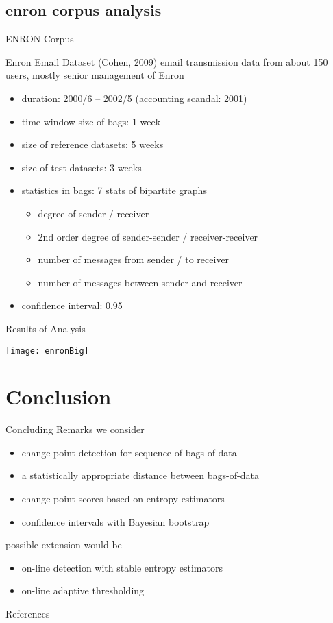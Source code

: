 \documentclass[fleqn,aspectratio=1610]{beamer}
\begin{document}
\subsection{enron corpus analysis}
\label{sec:orgead1550}
\begin{frame}[label={sec:org810af60}]{ENRON Corpus}
\begin{exampleblock}{Enron Email Dataset (Cohen, 2009)}\label{sec:orgfd8ed58}
email transmission data from about 150 users,
mostly senior management of Enron
\end{exampleblock}
\begin{itemize}
\item duration: 2000/6 -- 2002/5 (accounting scandal: 2001)
\item time window size of bags: 1 week
\item size of reference datasets: 5 weeks
\item size of test datasets: 3 weeks
\item statistics in bags: 7 stats of bipartite graphs
\begin{itemize}
\item degree of sender / receiver
\item 2nd order degree of sender-sender / receiver-receiver
\item number of messages from sender / to receiver
\item number of messages between sender and receiver
\end{itemize}
\item confidence interval: 0.95
\end{itemize}
\end{frame}

\begin{frame}[label={sec:orgbd4b9fe}]{Results of Analysis}
\begin{center}
\texttt{[image: enronBig]}
\end{center}
\nocite{Sun_etal2007kdd}
\end{frame}


\section{Conclusion}
\label{sec:org2888016}
\begin{frame}[label={sec:org728ef65}]{Concluding Remarks}
we consider
\begin{itemize}
\item change-point detection for sequence of bags of data
\item a statistically appropriate distance between bags-of-data
\item change-point scores based on entropy estimators
\item confidence intervals with Bayesian bootstrap
\end{itemize}
possible extension would be
\begin{itemize}
\item on-line detection with stable entropy estimators
\item on-line adaptive thresholding
\end{itemize}
\end{frame}

\begin{frame}[allowframebreaks]{References}
\printbibliography[heading=none]
\end{frame}
\end{document}
